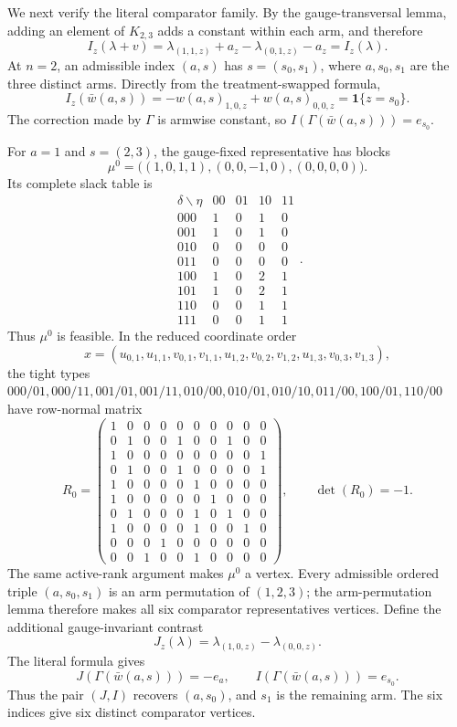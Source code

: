 We next verify the literal comparator family. By the gauge-transversal lemma, adding an element of \(K_{2,3}\) adds a constant within each arm, and therefore
\[I_z(\lambda+v)=\lambda_{(1,1,z)}+a_z-\lambda_{(0,1,z)}-a_z=I_z(\lambda).\]
At \(n=2\), an admissible index \((a,s)\) has \(s=(s_0,s_1)\), where \(a,s_0,s_1\) are the three distinct arms. Directly from the treatment-swapped formula,
\[I_z(\bar w(a,s))=-w(a,s)_{1,0,z}+w(a,s)_{0,0,z}=\mathbf1\{z=s_0\}.\]
The correction made by \(\Gamma\) is armwise constant, so \(I(\Gamma(\bar w(a,s)))=e_{s_0}\).

For \(a=1\) and \(s=(2,3)\), the gauge-fixed representative has blocks
\[\mu^0=\bigl((1,0,1,1),(0,0,-1,0),(0,0,0,0)\bigr).\]
Its complete slack table is
\[\begin{array}{c|rrrr}\delta\backslash\eta&00&01&10&11\\ \hline 000&1&0&1&0\\001&1&0&1&0\\010&0&0&0&0\\011&0&0&0&0\\100&1&0&2&1\\101&1&0&2&1\\110&0&0&1&1\\111&0&0&1&1\end{array}.\]
Thus \(\mu^0\) is feasible. In the reduced coordinate order
\[x=(u_{0,1},u_{1,1},v_{0,1},v_{1,1},u_{1,2},v_{0,2},v_{1,2},u_{1,3},v_{0,3},v_{1,3}),\]
the tight types \(000/01,000/11,001/01,001/11,010/00,010/01,010/10,011/00,100/01,110/00\) have row-normal matrix
\[R_0=\begin{pmatrix}1&0&0&0&0&0&0&0&0&0\\0&1&0&0&1&0&0&1&0&0\\1&0&0&0&0&0&0&0&0&1\\0&1&0&0&1&0&0&0&0&1\\1&0&0&0&0&1&0&0&0&0\\1&0&0&0&0&0&1&0&0&0\\0&1&0&0&0&1&0&1&0&0\\1&0&0&0&0&1&0&0&1&0\\0&0&0&1&0&0&0&0&0&0\\0&0&1&0&0&1&0&0&0&0\end{pmatrix},\qquad\det(R_0)=-1.\]
The same active-rank argument makes \(\mu^0\) a vertex. Every admissible ordered triple \((a,s_0,s_1)\) is an arm permutation of \((1,2,3)\); the arm-permutation lemma therefore makes all six comparator representatives vertices. Define the additional gauge-invariant contrast
\[J_z(\lambda)=\lambda_{(1,0,z)}-\lambda_{(0,0,z)}.\]
The literal formula gives
\[J(\Gamma(\bar w(a,s)))=-e_a,\qquad I(\Gamma(\bar w(a,s)))=e_{s_0}.\]
Thus the pair \((J,I)\) recovers \((a,s_0)\), and \(s_1\) is the remaining arm. The six indices give six distinct comparator vertices.

